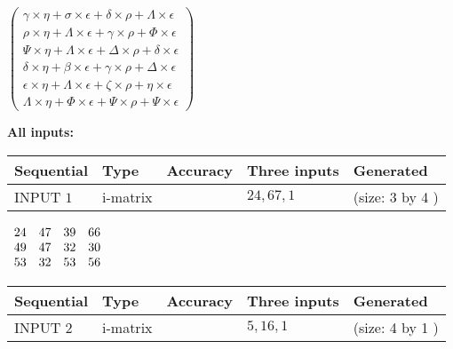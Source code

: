 \documentclass[12pt]{article}
\begin{document}
   
 $  \left( \begin{array}
 {
 c
 }
  \gamma \times  \eta +  \sigma \times  \epsilon +  \delta \times  \rho +  \Lambda \times  \epsilon \\ 
  \rho \times  \eta +  \Lambda \times  \epsilon +  \gamma \times  \rho +  \Phi \times  \epsilon \\ 
  \Psi \times  \eta +  \Lambda \times  \epsilon +  \Delta \times  \rho +  \delta \times  \epsilon \\ 
  \delta \times  \eta +  \beta \times  \epsilon +  \gamma \times  \rho +  \Delta \times  \epsilon \\ 
  \epsilon \times  \eta +  \Lambda \times  \epsilon +                     \zeta \times  \rho +  \eta \times  \epsilon \\ 
  \Lambda \times  \eta +  \Phi \times  \epsilon +  \Psi \times  \rho +  \Psi \times  \epsilon
 \end{array} \right) $ 
   
   
\noindent\vspace{0.1in}\hspace{-0.08in} {\textbf{\Large{All inputs: }}}
   
   
  
  
\noindent\begin{tabular}{|l|l|l|l|l|}
\hline
 Sequential & Type & Accuracy & Three inputs & Generated \\ 
\hline
 
 
  INPUT $            1 $ & i-matrix &  & $
 24
 , 
 67
 , 
 1
 $ & (size:            3  by            4 )
 \\  \hline  
 \end{tabular}
   
   
 $\begin{array}{
 c
 c
 c
 c
 }
          24  & 
          47  & 
          39  & 
          66  \\ 
          49  & 
          47  & 
          32  & 
          30  \\ 
          53  & 
          32  & 
          53  & 
          56
\end{array}  $ 
  
  
\noindent\begin{tabular}{|l|l|l|l|l|}
\hline
 Sequential & Type & Accuracy & Three inputs & Generated \\ 
\hline
 
 
  INPUT $            2 $ & i-matrix &  & $
 5
 , 
 16
 , 
 1
 $ & (size:            4  by            1 )
 \\  \hline  
 \end{tabular}
   
\end{document}
